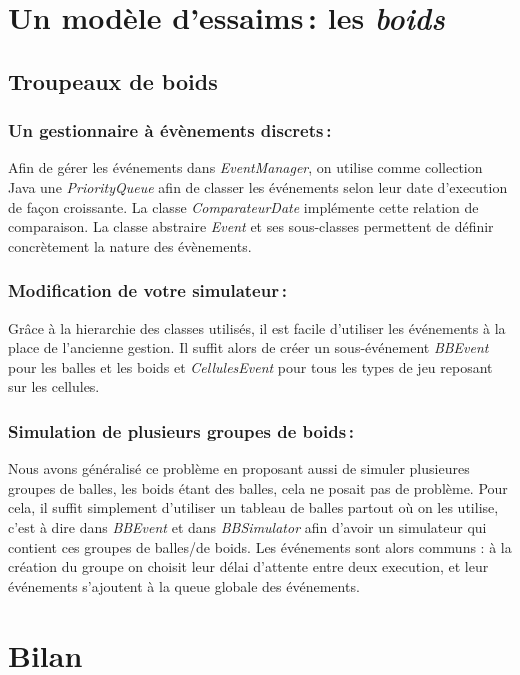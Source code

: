 \documentclass[a4paper, 10pt, french]{article}
\begin{document}
\section{Un modèle d'essaims\,: les {\em boids}}
  \subsection{Troupeaux de boids}
  {
  
  }
    \subsubsection{Un gestionnaire à évènements discrets\,:} 
      {
          \indent Afin de gérer les événements dans {\em EventManager}, on utilise comme collection Java une {\em PriorityQueue} afin de classer les événements selon leur date d'execution de façon croissante. La classe {\em ComparateurDate} implémente cette relation de comparaison. La classe abstraire {\em Event} et ses sous-classes permettent de définir concrètement la nature des évènements.
      } 
    \subsubsection{Modification de votre simulateur\,: } 
      {
          \indent Grâce à la hierarchie des classes utilisés, il est facile d'utiliser les événements à la place de l'ancienne gestion. Il suffit alors de créer un sous-événement {\em BBEvent} pour les balles et les boids et {\em CellulesEvent} pour tous les types de jeu reposant sur les cellules.
      }
      \subsubsection{Simulation de plusieurs groupes de boids\,: } 
      {
          \indent Nous avons généralisé ce problème en proposant aussi de simuler plusieures groupes de balles, les boids étant des balles, cela ne posait pas de problème. Pour cela, il suffit simplement d'utiliser un tableau de balles partout où on les utilise, c'est à dire dans {\em BBEvent} et dans {\em BBSimulator} afin d'avoir un simulateur qui contient ces groupes de balles/de boids. Les événements sont alors communs : à la création du groupe on choisit leur délai d'attente entre deux execution, et leur événements s'ajoutent à la queue globale des événements.
      }

\section{Bilan}
{

}
\end{document}
